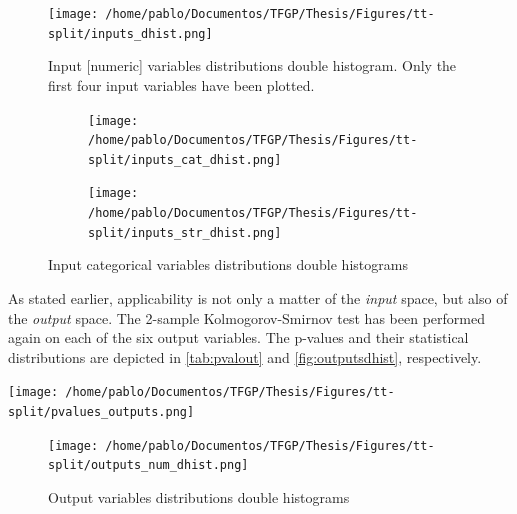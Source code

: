 %
\begin{figure}[!htb]
	\centering
	\texttt{[image: /home/pablo/Documentos/TFGP/Thesis/Figures/tt-split/inputs\_dhist.png]}
	\caption{Input [numeric] variables distributions double histogram. Only the first four input variables have been plotted.}
	\label{fig:inputsdhist}
\end{figure}
%
\begin{figure}[!htb]
	\centering
	\begin{subfigure}{\textwidth}
		\centering
		\texttt{[image: /home/pablo/Documentos/TFGP/Thesis/Figures/tt-split/inputs\_cat\_dhist.png]}
	\end{subfigure}
	
	
	\begin{subfigure}{\textwidth}
		\centering
		\texttt{[image: /home/pablo/Documentos/TFGP/Thesis/Figures/tt-split/inputs\_str\_dhist.png]}
	\end{subfigure}
	\caption{Input categorical variables distributions double histograms}
	\label{fig:inputscatdhist}
\end{figure}
%
\indent As stated earlier, applicability is not only a matter of the \textit{input} space, but also of the \textit{output} space. The 2-sample Kolmogorov-Smirnov test has been performed again on each of the six output variables. The p-values and their statistical distributions are depicted in \autoref{tab:pvalout} and \autoref{fig:outputsdhist}, respectively.\\
%
\begin{table}[!htb]
	\centering
	\label{tab:pvalout}
	\texttt{[image: /home/pablo/Documentos/TFGP/Thesis/Figures/tt-split/pvalues\_outputs.png]}
\end{table}
%
\begin{figure}[!htb]
	\centering
	\texttt{[image: /home/pablo/Documentos/TFGP/Thesis/Figures/tt-split/outputs\_num\_dhist.png]}
	\caption{Output variables distributions double histograms}
	\label{fig:outputsdhist}
\end{figure}
%
